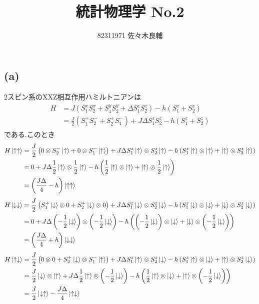 \documentclass[uplatex,a4j,11pt,dvipdfmx]{jsarticle}
\newcommand{\up}{\uparrow}
\newcommand{\dn}{\downarrow}
\begin{document}
\title{統計物理学 No.2}
\author{82311971 佐々木良輔}
\date{}
\maketitle
\subsection*{(a)}
2スピン系のXXZ相互作用ハミルトニアンは
\begin{align}
  \begin{split}
    H&=J(S_1^xS_2^x+S_1^yS_2^y+\Delta S_1^zS_2^z)-h(S_1^z+S_2^z)\\
    &=\frac{J}{2}(S_1^+S_2^-+S_2^+S_1^-)+J\Delta S_1^zS_2^z-h(S_1^z+S_2^z)
  \end{split}
\end{align}
である.このとき
\begin{align}
  \begin{split}
    H\Ket{\up\up}&=\frac{J}{2}\left(0\otimes S_2^-\Ket{\up}+0\otimes S_1^-\Ket{\up}\right)+J\Delta S_1^z\Ket{\up}\otimes S_2^z\Ket{\up}-h\left(S_1^z\Ket{\up}\otimes\Ket{\up}+\Ket{\up}\otimes S_2^z\Ket{\up}\right)\\
    &=0+J\Delta\frac{1}{2}\Ket{\up}\otimes\frac{1}{2}\Ket{\up}-h\left(\frac{1}{2}\Ket{\up}\otimes\Ket{\up}+\Ket{\up}\otimes\frac{1}{2}\Ket{\up}\right)\\
    &=\left(\frac{J\Delta}{4}-h\right)\Ket{\up\up}
  \end{split}
\end{align}
\begin{align}
  \begin{split}
    H\Ket{\dn\dn}&=\frac{J}{2}\left(S_1^+\Ket{\dn}\otimes0+S_2^+\Ket{\dn}\otimes0\right)+J\Delta S_1^z\Ket{\dn}\otimes S_2^z\Ket{\dn}-h\left(S_1^z\Ket{\dn}\otimes\Ket{\dn}+\Ket{\dn}\otimes S_2^z\Ket{\dn}\right)\\
    &=0+J\Delta\left(-\frac{1}{2}\Ket{\dn}\right)\otimes\left(-\frac{1}{2}\Ket{\dn}\right)
    -h\left(\left(-\frac{1}{2}\Ket{\dn}\right)\otimes\Ket{\dn}+\Ket{\dn}\otimes\left(-\frac{1}{2}\Ket{\dn}\right)\right)\\
    &=\left(\frac{J\Delta}{4}+h\right)\Ket{\dn\dn}
  \end{split}
\end{align}
\begin{align}
  \begin{split}
    H\Ket{\up\dn}&=\frac{J}{2}\left(0\otimes0+S_2^+\Ket{\dn}\otimes S_1^-\Ket{\up}\right)+J\Delta S_1^z\Ket{\up}\otimes S_2^z\Ket{\dn}-h\left(S_1^z\Ket{\up}\otimes\Ket{\dn}+\Ket{\up}\otimes S_2^z\Ket{\dn}\right)\\
    &=\frac{J}{2}\Ket{\dn}\otimes\Ket{\up}+J\Delta\frac{1}{2}\Ket{\up}\otimes\left(-\frac{1}{2}\Ket{\dn}\right)-h\left(\frac{1}{2}\Ket{\up}\otimes\Ket{\dn}+\Ket{\up}\otimes\left(-\frac{1}{2}\Ket{\dn}\right)\right)\\
    &=\frac{J}{2}\Ket{\dn\up}-\frac{J\Delta}{4}\Ket{\up\dn}
  \end{split}
\end{align}
\end{document}

